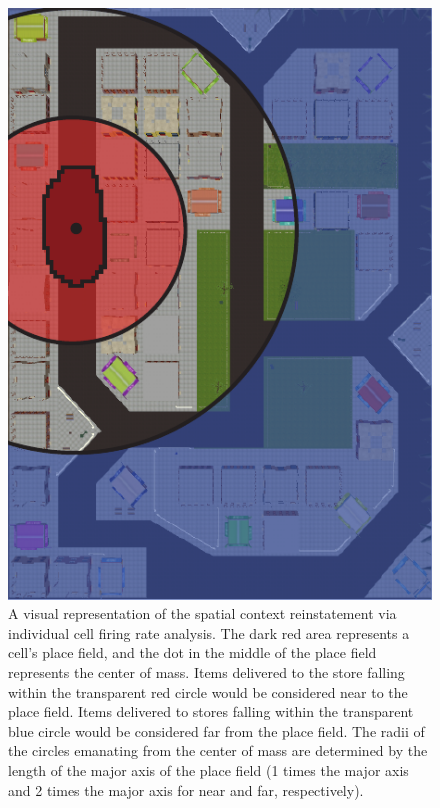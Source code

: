  \begin{figure}
\centering
  \includegraphics[width=.6\textwidth]{./tex/dboy/figs/firing_rate_method}
  \caption[Spatial context reinstatement via individual cell firing rate analysis method]{A visual representation of the spatial context reinstatement via individual cell firing rate analysis. The dark red area represents a cell's place field, and the dot in the middle of the place field represents the center of mass.  Items delivered to the store falling within the transparent red circle would be considered near to the place field. Items delivered to stores falling within the transparent blue circle would be considered far from the place field. The radii of the circles emanating from the center of mass are determined by the length of the major axis of the place field (1 times the major axis and 2 times the major axis for near and far, respectively).}
\label{fig:fr_by_cond_methods}
\end{figure}

